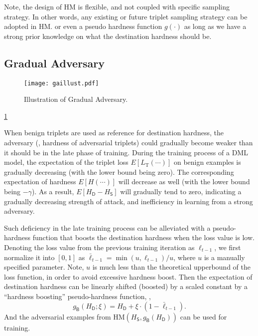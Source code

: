 \documentclass[10pt,twocolumn,letterpaper]{article}
\begin{document}
Note, the design of HM is flexible, and not coupled with specific sampling
strategy.
%
In other words, any existing or future triplet sampling strategy can
be adopted in HM.
%
or even a pseudo hardness function $g(\cdot)$ as long as we have a strong
prior knowledge on what the destination hardness should be.

\subsection{Gradual Adversary}
\label{sec:32}

\begin{figure}
	\texttt{[image: gaillust.pdf]}
	\caption{Illustration of Gradual Adversary.}
	\label{fig:ga}
\end{figure}

\cref{fig:ga}


When benign triplets are used as reference for destination hardness, the
adversary (\ie, hardness of adversarial triplets) could gradually become weaker
than it should be in the late phase of training.
%
During the training process of a DML model, the expectation of the triplet loss
$E[L_\text{T}(\cdots)]$ on benign examples is gradually decreasing
(with the lower bound being zero).
%
The corresponding expectation of hardness $E[H(\cdots)]$ will
decrease as well (with the lower bound being $-\gamma$).
%
As a result, $E[H_\mathsf{D}-H_\mathsf{S}]$ will gradually tend to zero,
indicating a gradually decreasing strength of attack, and inefficiency in
learning from a strong adversary.


Such deficiency in the late training process can be alleviated with a
pseudo-hardness function that boosts the destination hardness when the loss
value is low.
%
Denoting the loss value from the previous training iteration as $\ell_{t-1}$,
we first normalize it into $[0,1]$ as $\bar{\ell}_{t-1}=\min(u,\ell_{t-1})/u$,
where $u$ is a manually specified parameter.
%
Note, $u$ is much less than the theoretical upperbound of the loss function,
in order to avoid excessive hardness boost.
%
Then the expectation of destination hardness can be linearly shifted (boosted)
by a scaled constant by a ``hardness boosting'' pseudo-hardness
function, \ie,
%
\begin{equation}
	g_\mathsf{B}(H_\mathsf{D};\xi) = H_\mathsf{D} + \xi \cdot (1-\bar{\ell}_{t-1}).
\end{equation}
%
And the adversarial examples from $\text{HM}(H_\mathsf{S},g_\mathsf{B}(H_\mathsf{D}))$
can be used for training.
\end{document}
